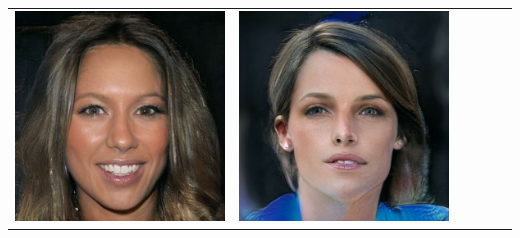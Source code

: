 \documentclass[a0,landscape]{a0poster}
\begin{document}
\begin{multicols}{3}
\begin{center}
\begin{tabular}{cc|cc|cc}
\includegraphics[width=\pganw]{../figures/pgan/48_base_iso_MH.jpg} &
\includegraphics[width=\pganw]{../figures/pgan/49_base_iso_MH.jpg} \\

\end{tabular}
\end{center}
\end{multicols}
\end{document}
